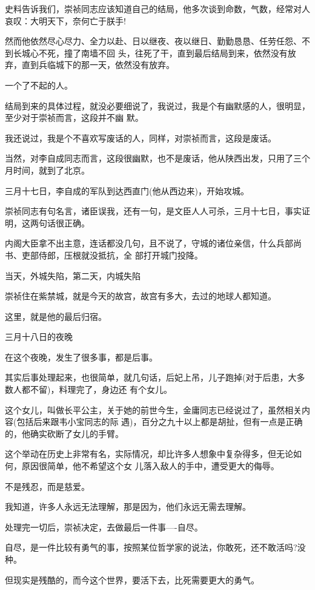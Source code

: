 \documentclass[11pt,a4paper,onecolumn]{article}
\begin{document}
史料告诉我们，崇祯同志应该知道自己的结局，他多次谈到命数，气数，经常对人哀叹：大明天下，奈何亡于朕手!

然而他依然尽心尽力、全力以赴、日以继夜、夜以继日、勤勤恳恳、任劳任怨、不到长城心不死，撞了南墙不回
头，往死了干，直到最后结局到来，依然没有放弃，直到兵临城下的那一天，依然没有放弃。

一个了不起的人。

结局到来的具体过程，就没必要细说了，我说过，我是个有幽默感的人，很明显，至少对于崇祯而言，这段并不幽
默。

我还说过，我是个不喜欢写废话的人，同样，对崇祯而言，这段是废话。

当然，对李自成同志而言，这段很幽默，也不是废话，他从陕西出发，只用了三个月时间，就到了北京。

三月十七日，李自成的军队到达西直门(他从西边来)，开始攻城。

崇祯同志有句名言，诸臣误我，还有一句，是文臣人人可杀，三月十七日，事实证明，这两句话很正确。

内阁大臣拿不出主意，连话都没几句，且不说了，守城的诸位亲信，什么兵部尚书、吏部侍郎，压根就没抵抗，全
部打开城门投降。

当天，外城失陷，第二天，内城失陷

崇祯住在紫禁城，就是今天的故宫，故宫有多大，去过的地球人都知道。

这里，就是他的最后归宿。

三月十八日的夜晚

在这个夜晚，发生了很多事，都是后事。

其实后事处理起来，也很简单，就几句话，后妃上吊，儿子跑掉(对于后患，大多数人都不留)，料理完了，身边还
有个女儿。

这个女儿，叫做长平公主，关于她的前世今生，金庸同志已经说过了，虽然相关内容(包括后来跟韦小宝同志的际
遇)，百分之九十以上都是胡扯，但有一点是正确的，他确实砍断了女儿的手臂。

这个举动在历史上非常有名，实际情况，却比许多人想象中复杂得多，但无论如何，原因很简单，他不希望这个女
儿落入敌人的手中，遭受更大的侮辱。

不是残忍，而是慈爱。

我知道，许多人永远无法理解，那是因为，他们永远无需去理解。

处理完一切后，崇祯决定，去做最后一件事----自尽。

自尽，是一件比较有勇气的事，按照某位哲学家的说法，你敢死，还不敢活吗?没种。

但现实是残酷的，而今这个世界，要活下去，比死需要更大的勇气。
\end{document}
